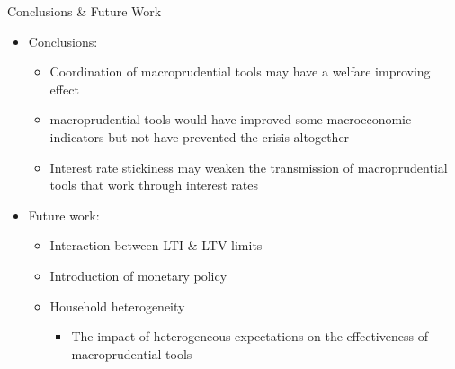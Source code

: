 \documentclass[8pt,aspectratio=169]{beamer}
\numberwithin{equation}{section}
\begin{document}
\begin{frame}{Conclusions \& Future Work}


\begin{itemize}
\item Conclusions:
\vspace{3 mm}
\begin{itemize}
\item Coordination of macroprudential tools may have a welfare improving effect
\vspace{3 mm}
\item macroprudential tools would have improved some macroeconomic indicators but not have prevented the crisis altogether
\vspace{3 mm}
\item Interest rate stickiness may weaken the transmission of macroprudential tools that work through interest rates
\end{itemize}

\vspace{5 mm}
\item Future work: 
\vspace{3 mm}
\begin{itemize}
\item Interaction between LTI \& LTV limits
\vspace{3 mm}
\item Introduction of monetary policy 
\vspace{3 mm}
\item Household heterogeneity 

\begin{itemize}
\item The impact of heterogeneous expectations on the effectiveness of macroprudential tools
\end{itemize}
\end{itemize}

\end{itemize}
\end{frame}
\end{document}
